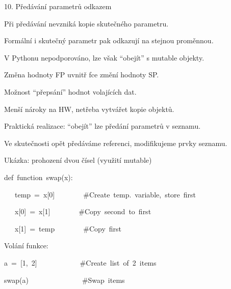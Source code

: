 \documentclass[czech]{beamer}
\newenvironment{lyxcode}
  {\par\begin{list}{}{
    \setlength{\rightmargin}{\leftmargin}
    \setlength{\listparindent}{0pt}%
    \raggedright
    \setlength{\itemsep}{0pt}
    \setlength{\parsep}{0pt}
    \normalfont\ttfamily}%
   \def\{{\char`\{}
   \def\}{\char`\}}
   \def\textasciitilde{\char`\~}
   \item[]}
  {\end{list}}
\begin{document}
\begin{frame}{10. Předávání parametrů odkazem}

{\footnotesize Při předávání nevzniká kopie skutečného parametru.}{\footnotesize\par}

{\footnotesize Formální i skutečný parametr pak odkazují na stejnou
proměnnou}{\footnotesize\emph{.}}{\footnotesize\par}

{\footnotesize V Pythonu nepodporováno, lze však ``obejít'' s mutable
objekty.}{\footnotesize\par}

{\footnotesize\bigskip{}
}{\footnotesize\par}

{\footnotesize Změna hodnoty FP uvnitř fce změní hodnoty SP.}{\footnotesize\par}

{\footnotesize Možnost ``přepsání'' hodnot volajících dat.}{\footnotesize\par}

{\footnotesize Menší nároky na HW, netřeba vytvářet kopie objektů.}{\footnotesize\par}

{\footnotesize\bigskip{}
}{\footnotesize\par}

{\footnotesize Praktická realizace: ``obejít'' lze předání parametrů
v seznamu.}{\footnotesize\par}

{\footnotesize Ve skutečnosti opět předáváme referenci, modifikujeme
prvky seznamu.}{\footnotesize\par}

{\footnotesize\bigskip{}
}{\footnotesize\par}

{\footnotesize Ukázka: prohození dvou čísel (využití mutable)}{\footnotesize\par}
\begin{lyxcode}
{\footnotesize def~function~swap(x):}{\footnotesize\par}

{\footnotesize ~~~temp~=~x{[}0{]}~~~~~~~~\#Create~temp.~variable,~store~first}{\footnotesize\par}

{\footnotesize ~~~x{[}0{]}~=~x{[}1{]}~~~~~~~~\#Copy~second~to~first}{\footnotesize\par}

{\footnotesize ~~~x{[}1{]}~=~temp~~~~~~~~\#Copy~first}{\footnotesize\par}
\end{lyxcode}
{\footnotesize Volání funkce:}{\footnotesize\par}
\begin{lyxcode}
{\footnotesize a~=~{[}1,~2{]}~~~~~~~~~~~~\#Create~list~of~2~items}{\footnotesize\par}

{\footnotesize swap(a)~~~~~~~~~~~~~~~\#Swap~items}{\footnotesize\par}
\end{lyxcode}
\end{frame}
\end{document}
